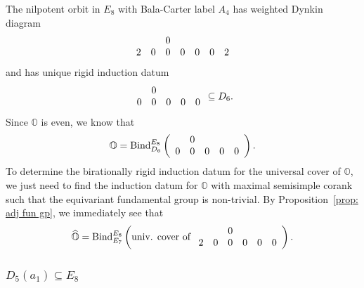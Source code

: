 \documentclass[11pt]{amsart}
\renewcommand{\O}{{\mathbb O}}
\newcommand{\BInd}{{{\mbox{\rm Bind}}}}
\newcommand{\hatO}{\widehat{\O}}
\numberwithin{equation}{section}
\begin{document}
	The nilpotent orbit in $E_8$ with Bala-Carter label $A_4$ has weighted Dynkin diagram
	$$\begin{array}{c c c c c c c}
		& & 0 & & & & \\
		2 & 0 & 0 & 0 & 0 & 0 & 2 \\
	\end{array}$$ and has unique rigid induction datum $$\begin{array}{c c c c c}
		& 0 & & & \\
		0 & 0 & 0 & 0 & 0 \\
	\end{array}\subseteq D_6.$$
	Since $\O$ is even, we know that $$\O=\BInd_{D_6}^{E_8}\left(\begin{array}{c c c c c}
		& 0 & & & \\
		0 & 0 & 0 & 0 & 0 \\
	\end{array}\right).$$ To determine the birationally rigid induction datum for the universal cover of $\O$, we just need to find the induction datum for $\O$ with maximal semisimple corank such that the equivariant fundamental group is non-trivial. By Proposition~\ref{prop: adj fun gp}, we immediately see that $$\hatO=\BInd_{E_7}^{E_8}\left(\mbox{univ. cover of }\begin{array}{c c c c c c}
		& & 0 & & & \\
		2 & 0 & 0 & 0 & 0 & 0 \\
	\end{array}\right).$$
	
	\subsubsection{\texorpdfstring{$D_5(a_1)\subseteq E_8$}{D5a1 in E8}}\label{sss: D5a1 in E8}
	
\end{document}
